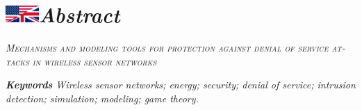 \chapter[Résumé (anglais)]{\includegraphics[height=18pt]{Front/Figures/US-UK_flag.pdf}\quad\itshape Abstract}

\begin{english}
\begin{center}
    \LARGE\it\scshape\color{chapterLACL}Mechanisms and modeling tools for protection against denial of service attacks in wireless sensor networks
\end{center}
\vspace{2\baselineskip}

{\itshape

}

\vspace{2\baselineskip}
{\it
\noindent\textbf{Keywords} Wireless sensor networks; energy; security; denial of service; intrusion detection; simulation; modeling; game theory.
}
\end{english}
